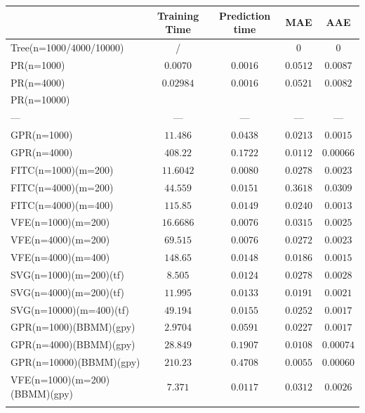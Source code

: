 \documentclass[12pt,a4paper,oneside]{book}
\begin{document}
\begin{table}\centering 
\begin{tabular}[t]{lcccc}\toprule
            &   Training Time  &  Prediction time &  MAE & AAE   \\ \midrule
Tree(n=1000/4000/10000)    &/ &  &  $0$  & $0$     \\\addlinespace
PR(n=1000) & $0.0070$ & $0.0016$   & $0.0512$ &  $0.0087$     \\\addlinespace
PR(n=4000)    & $0.02984$  & $0.0016$   & $0.0521$ & $0.0082$   \\\addlinespace
PR(n=10000)	   &  &    &  &      \\\addlinespace
\qquad \qquad \qquad \qquad \qquad ---	  &   --- & --- & --- & ---     \\\addlinespace
GPR(n=1000) & $11.486$ & $0.0438$   & $0.0213$ & $0.0015$      \\\addlinespace
GPR(n=4000)   & $408.22$ & $0.1722$   & $0.0112$ & $0.00066$     \\\addlinespace
FITC(n=1000)(m=200)   & $11.6042$ & $0.0080$    & $0.0278$  & $0.0023$ \\\addlinespace
FITC(n=4000)(m=200)    & $44.559$ & $0.0151$   & $0.3618$ & $0.0309$    \\\addlinespace
FITC(n=4000)(m=400)	  & $115.85$ & $0.0149$   & $0.0240$ & $0.0013$    \\\addlinespace
VFE(n=1000)(m=200)   & $16.6686$ & $0.0076$   & $0.0315$ & $0.0025$  \\\addlinespace
VFE(n=4000)(m=200)   & $69.515$  & $0.0076$   & $0.0272$  & $0.0023$\\\addlinespace
VFE(n=4000)(m=400)	  & $148.65$ & $0.0148$   & $0.0186$ & $0.0015$\\\addlinespace
SVG(n=1000)(m=200)(tf)    & $8.505$  &  $0.0124$  & $0.0278$ & $0.0028$  \\\addlinespace
SVG(n=4000)(m=200)(tf)   & $11.995$ &  $0.0133$  & $0.0191$  & $0.0021$ \\\addlinespace
SVG(n=10000)(m=400)(tf)	  & $49.194$ & $0.0155$   & $0.0252$ & $0.0017$  \\\addlinespace
GPR(n=1000)(BBMM)(gpy)   & $2.9704$  &  $0.0591$  & $0.0227$ & $0.0017$ \\\addlinespace
GPR(n=4000)(BBMM)(gpy)   & $28.849$ & $0.1907$   & $0.0108$ & $0.00074$  \\\addlinespace
GPR(n=10000)(BBMM)(gpy)   & $210.23$ &  $0.4708$  & $0.0055$ & $0.00060$ \\\addlinespace
VFE(n=1000)(m=200)(BBMM)(gpy)   & $7.371$ & $0.0117$   & $0.0312$ & $0.0026$ \\\addlinespace

\end{tabular}
\end{table}
\end{document}

